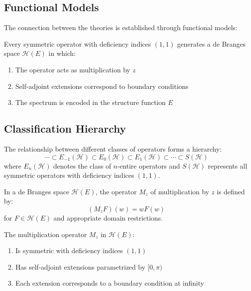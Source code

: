 \subsection{Functional Models}

The connection between the theories is established through functional models:

\begin{theorem}
\label{thm:functional-model}
Every symmetric operator with deficiency indices $(1,1)$ generates a de Branges space $\mathcal{H}(E)$ in which:
\begin{enumerate}
\item The operator acts as multiplication by $z$
\item Self-adjoint extensions correspond to boundary conditions
\item The spectrum is encoded in the structure function $E$
\end{enumerate}
\end{theorem}

\subsection{Classification Hierarchy}

The relationship between different classes of operators forms a hierarchy:
$$\cdots \subset E_{-1}(\mathcal{H}) \subset E_0(\mathcal{H}) \subset E_1(\mathcal{H}) \subset \cdots \subset S(\mathcal{H})$$
where $E_n(\mathcal{H})$ denotes the class of $n$-entire operators and $S(\mathcal{H})$ represents all symmetric operators with deficiency indices $(1,1)$.

\begin{definition}
In a de Branges space $\mathcal{H}(E)$, the operator $M_z$ of multiplication by $z$ is defined by:
$$(M_z F)(w) = w F(w)$$
for $F \in \mathcal{H}(E)$ and appropriate domain restrictions.
\end{definition}

\begin{proposition}[Properties of $M_z$]
The multiplication operator $M_z$ in $\mathcal{H}(E)$:
\begin{enumerate}
\item Is symmetric with deficiency indices $(1,1)$
\item Has self-adjoint extensions parametrized by $[0,\pi)$  
\item Each extension corresponds to a boundary condition at infinity
\end{enumerate}
\end{proposition}

